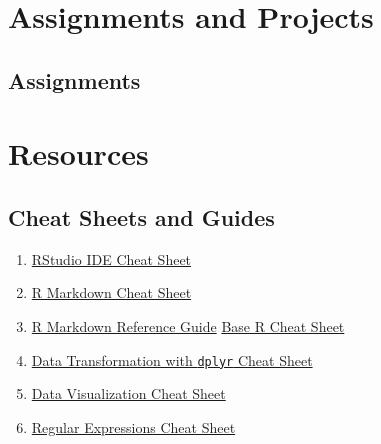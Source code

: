 \documentclass[]{book}
\begin{document}
\part{Assignments and
Projects}\label{part-assignments-and-projects}

\chapter{Assignments}\label{assignments-1}

\part{Resources}\label{part-resources}

\chapter{Cheat Sheets and Guides}\label{cheat-sheets-and-guides}

\begin{enumerate}
\def\labelenumi{\arabic{enumi}.}
\item
  \href{https://github.com/rstudio/cheatsheets/raw/master/rstudio-ide.pdf}{RStudio
  IDE Cheat Sheet}
\item
  \href{https://github.com/rstudio/cheatsheets/raw/master/rmarkdown-2.0.pdf}{R
  Markdown Cheat Sheet}
\item
  \href{https://www.rstudio.com/wp-content/uploads/2015/03/rmarkdown-reference.pdf}{R
  Markdown Reference Guide}
  \href{http://github.com/rstudio/cheatsheets/raw/master/base-r.pdf}{Base
  R Cheat Sheet}
\item
  \href{https://github.com/rstudio/cheatsheets/raw/master/data-transformation.pdf}{Data
  Transformation with \texttt{dplyr} Cheat Sheet}
\item
  \href{https://github.com/rstudio/cheatsheets/raw/master/data-visualization-2.1.pdf}{Data
  Visualization Cheat Sheet}
\item
  \href{https://github.com/rstudio/cheatsheets/raw/master/regex.pdf}{Regular
  Expressions Cheat Sheet}
\end{enumerate}


\end{document}
